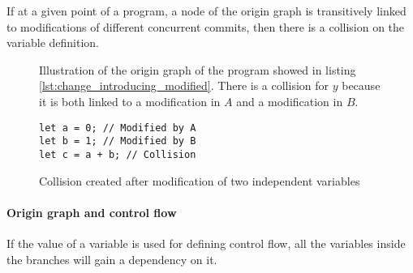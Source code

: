 \documentclass[a4paper,10pt]{article}
\begin{document}
If at a given point of a program, a node of the origin graph is transitively linked to modifications of different concurrent commits, then there is a collision on the variable definition.

\begin{figure}[ht]
\centering{}
\caption{Illustration of the origin graph of the program showed in listing \ref{lst:change_introducing_modified}. There is a collision for $y$ because it is both linked to a modification in $A$ and a modification in $B$.}
\label{fig:change_introducing_modified}
\end{figure}

\begin{figure}[ht]
\begin{minipage}{.5\textwidth}
\begin{lstlisting}
let a = 0; // Modified by A
let b = 1; // Modified by B
let c = a + b; // Collision
\end{lstlisting}
\end{minipage}\hfill
\begin{minipage}{.45\textwidth}
\centering{}
\end{minipage}
\caption{Collision created after modification of two independent variables}
\end{figure}
\FloatBarrier

\paragraph{Origin graph and control flow} If the value of a variable is used for defining control flow, all the variables inside the branches will gain a dependency on it.
\end{document}
